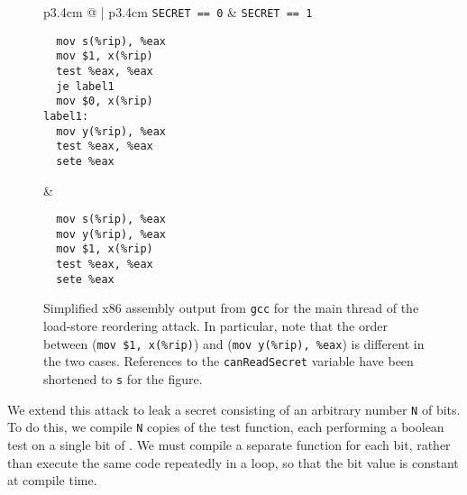 \begin{figure}
  \begin{tabular}{p{3.4cm} @{\quad} | p{3.4cm}}
    \texttt{SECRET == 0} & \texttt{SECRET == 1} \\ \hline
\begin{verbatim}
  mov s(%rip), %eax
  mov $1, x(%rip)
  test %eax, %eax
  je label1
  mov $0, x(%rip)
label1:
  mov y(%rip), %eax
  test %eax, %eax
  sete %eax
\end{verbatim}
  &
\begin{verbatim}
  mov s(%rip), %eax
  mov y(%rip), %eax
  mov $1, x(%rip)
  test %eax, %eax
  sete %eax
\end{verbatim}
  \end{tabular}
  \caption{
    Simplified x86 assembly output from \texttt{gcc} for the main thread of
    the load-store reordering attack.
    In particular, note that the order between (\texttt{mov \$1, x(\%rip)})
    and (\texttt{mov y(\%rip), \%eax}) is different in the two cases.
    References to the \texttt{canReadSecret} variable have been shortened to
    \texttt{s} for the figure.
  }
  \label{fig:lsr-asm}
\end{figure}

We extend this attack to leak a secret consisting of an arbitrary number
\verb|N| of bits.
To do this, we compile \verb|N| copies of the test function, each
performing a boolean test on a single bit of {\SEC}.
We must compile a separate function for each bit, rather than execute the same
code repeatedly in a loop, so that the bit value is
constant at compile time.

